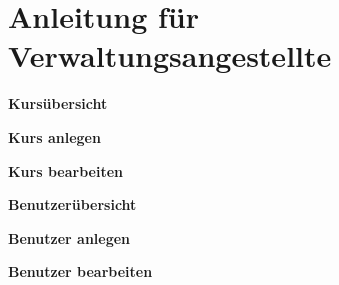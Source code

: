 
\chapter{Anleitung für Verwaltungsangestellte}
\label{sec:chap1}
\textbf{Kursübersicht}

\textbf{Kurs anlegen}

\textbf{Kurs bearbeiten}

\textbf{Benutzerübersicht}

\textbf{Benutzer anlegen}

\textbf{Benutzer bearbeiten}

